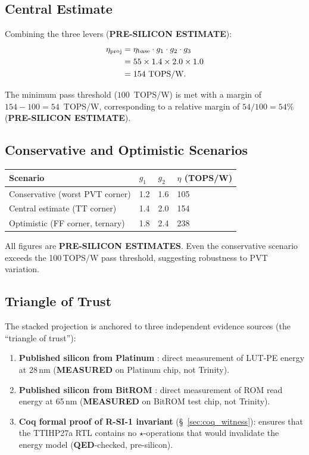 \subsection{Central Estimate}

Combining the three levers (\textbf{PRE-SILICON ESTIMATE}):
\begin{align}
  \eta_{\mathrm{proj}}
  &= \eta_{\mathrm{base}} \cdot g_{1} \cdot g_{2} \cdot g_{3} \notag \\
  &= 55 \times 1.4 \times 2.0 \times 1.0 \notag \\
  &= 154\text{ TOPS/W}. \label{eq:central}
\end{align}

The minimum pass threshold (\(100\)~TOPS/W) is met with a margin of
\(154 - 100 = 54\)~TOPS/W, corresponding to a relative margin of
\(54/100 = 54\%\) (\textbf{PRE-SILICON ESTIMATE}).

\subsection{Conservative and Optimistic Scenarios}

\begin{center}
\begin{tabular}{llll}
\toprule
Scenario & \(g_{1}\) & \(g_{2}\) & \(\eta\) (TOPS/W) \\
\midrule
Conservative (worst PVT corner) & 1.2 & 1.6 & 105 \\
Central estimate (TT corner)    & 1.4 & 2.0 & 154 \\
Optimistic (FF corner, ternary) & 1.8 & 2.4 & 238 \\
\bottomrule
\end{tabular}
\end{center}

All figures are \textbf{PRE-SILICON ESTIMATES}.  Even the conservative scenario
exceeds the 100\,TOPS/W pass threshold, suggesting robustness to PVT variation.

\subsection{Triangle of Trust}

The stacked projection is anchored to three independent evidence sources
(the ``triangle of trust''):

\begin{enumerate}
  \item \textbf{Published silicon from Platinum} \cite{platinum_lut_pe_2026}:
    direct measurement of LUT-PE energy at 28\,nm
    (\textbf{MEASURED} on Platinum chip, not Trinity).
  \item \textbf{Published silicon from BitROM} \cite{bitrom_2025}:
    direct measurement of ROM read energy at 65\,nm
    (\textbf{MEASURED} on BitROM test chip, not Trinity).
  \item \textbf{Coq formal proof of R-SI-1 invariant} (§~\ref{sec:coq_witness}):
    ensures that the TTIHP27a RTL contains no \(\star\)-operations that would
    invalidate the energy model (\textbf{QED}-checked, pre-silicon).
\end{enumerate}


